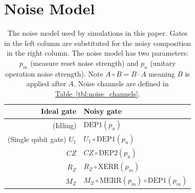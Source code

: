 \documentclass[onecolumn,unpublished,a4paper]{quantumarticle}
\theoremstyle{definition}
\theoremstyle{definition}
\theoremstyle{definition}
\newcommand{\tbl}[1]{\hyperref[tbl:#1]{Table~\ref*{tbl:#1}}}
\begin{document}
\appendix

\clearpage
\section{Noise Model}
\label{app:noise_model}

\begin{table}[h!]
    \centering
    \begin{tabular}{|r|l|}
    \hline
    Ideal gate & Noisy gate
    \\
    \hline
    (Idling) & $\text{DEP1}(p_u)$
    \\
    (Single qubit gate) $U_1$ & $U_1 \circ \text{DEP1}(p_u)$
    \\
    $CZ$ & $CZ \circ \text{DEP2}(p_u)$
    \\
    \hline
    $R_Z$ & $R_Z \circ \text{XERR}(p_m)$
    \\
    $M_Z$ & $M_Z \circ \text{MERR}(p_m) \circ \text{DEP1}(p_m)$
    \\
    \hline
    \end{tabular}
    \caption{
        The noise model used by simulations in this paper.
        Gates in the left column are substituted for the noisy composition in the right column.
        The noise model has two parameters: $p_m$ (measure reset noise strength) and $p_u$ (unitary operation noise strength).
        Note $A \circ B = B \cdot A$ meaning $B$ is applied after $A$.
        Noise channels are defined in \tbl{noise_channels}.
    }
    \label{tbl:noise_model}
\end{table}
\end{document}
